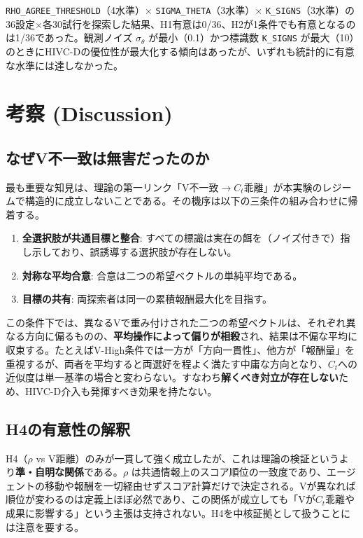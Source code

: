 \documentclass[11pt]{ltjsarticle}
\newcommand{\Ct}{\ensuremath{C_t}}
\begin{document}
\texttt{RHO\_AGREE\_THRESHOLD}（4水準）$\times$ \texttt{SIGMA\_THETA}（3水準）$\times$ \texttt{K\_SIGNS}（3水準）の36設定$\times$各30試行を探索した結果、H1有意は0/36、H2が1条件でも有意となるのは1/36であった。観測ノイズ $\sigma_\theta$ が最小（0.1）かつ標識数 \texttt{K\_SIGNS} が最大（10）のときにHIVC-Dの優位性が最大化する傾向はあったが、いずれも統計的に有意な水準には達しなかった。

\section{考察 (Discussion)}

\subsection{なぜV不一致は無害だったのか}

最も重要な知見は、理論の第一リンク「V不一致$\to$\Ct{}乖離」が本実験のレジームで構造的に成立しないことである。その機序は以下の三条件の組み合わせに帰着する。

\begin{enumerate}[nosep]
  \item \textbf{全選択肢が共通目標と整合}: すべての標識は実在の餌を（ノイズ付きで）指し示しており、誤誘導する選択肢が存在しない。
  \item \textbf{対称な平均合意}: 合意は二つの希望ベクトルの単純平均である。
  \item \textbf{目標の共有}: 両探索者は同一の累積報酬最大化を目指す。
\end{enumerate}

この条件下では、異なるVで重み付けされた二つの希望ベクトルは、それぞれ異なる方向に偏るものの、\textbf{平均操作によって偏りが相殺}され、結果は不偏な平均に収束する。たとえばV-High条件では一方が「方向一貫性」、他方が「報酬量」を重視するが、両者を平均すると両選好を程よく満たす中庸な方向となり、\Ct{}への近似度は単一基準の場合と変わらない。すなわち\textbf{解くべき対立が存在しない}ため、HIVC-D介入も発揮すべき効果を持たない。

\subsection{H4の有意性の解釈}

H4（$\rho$ vs V距離）のみが一貫して強く成立したが、これは理論の検証というより\textbf{準・自明な関係}である。$\rho$ は共通情報上のスコア順位の一致度であり、エージェントの移動や報酬を一切経由せずスコア計算だけで決定される。Vが異なれば順位が変わるのは定義上ほぼ必然であり、この関係が成立しても「Vが\Ct{}乖離や成果に影響する」という主張は支持されない。H4を中核証拠として扱うことには注意を要する。
\end{document}
